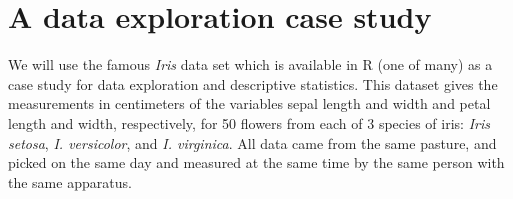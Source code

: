 \section{A data exploration case study}

% 
% 


We will use the famous {\it Iris} data set which is available in R (one 
of many) as a case study for data exploration and descriptive 
statistics. This dataset gives the measurements in centimeters of the 
variables sepal length and width and petal length and width, 
respectively, for 50 flowers from each of 3 species of iris: {\it Iris 
setosa}, {\it I. versicolor}, and {\it I. virginica}. All data came 
from the same  pasture, and picked on the same day and measured at the 
same time by the same person with the same apparatus. 

